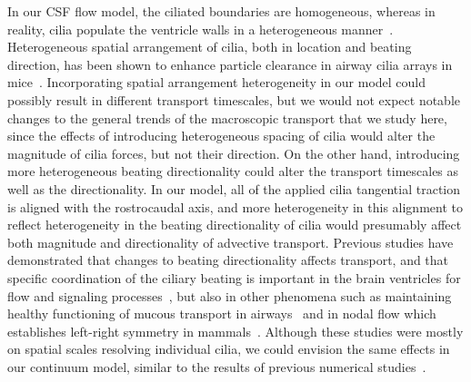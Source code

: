 \documentclass[fleqn]{wlscirep}
\begin{document}
In our CSF flow model, the ciliated boundaries are homogeneous, whereas in reality, cilia populate the ventricle walls in a heterogeneous manner~\cite{Olstad2019CiliaryDevelopment}. Heterogeneous spatial arrangement of cilia, both in location and beating direction, has been shown to enhance particle clearance in airway cilia arrays in mice~\cite{Ramirez-SanJuan2020Multi-scaleArrays}. Incorporating spatial arrangement heterogeneity in our model could possibly result in different transport timescales, but we would not expect notable changes to the general trends of the macroscopic transport that we study here, since the effects of introducing heterogeneous spacing of cilia would alter the magnitude of cilia forces, but not their direction. On the other hand, introducing more heterogeneous beating directionality could alter the transport timescales as well as the directionality. In our model, all of the applied cilia tangential traction is aligned with the rostrocaudal axis, and more heterogeneity in this alignment to reflect heterogeneity in the beating directionality of cilia would presumably affect both magnitude and directionality of advective transport. Previous studies have demonstrated that changes to beating directionality affects transport, and that specific coordination of the ciliary beating is important in the brain ventricles for flow and signaling processes~\cite{Eichele2020Cilia-drivenVentricle, Olstad2019CiliaryDevelopment, Faubel2016Cilia-basedVentricles, Guirao2010CouplingCilia, Afzelius2004Cilia-relatedDiseases}, but also in other phenomena such as maintaining healthy functioning of mucous transport in airways~\cite{Rayner1996CiliarySyndrome, Schneiter2021Multi-scaleFunction, Bustamante-Marin2019LackClearance, Tsukita2012CoordinatedFeet} and in nodal flow which establishes left-right symmetry in mammals~\cite{Yoshiba2014RolesSymmetry, Hirokawa2006NodalAsymmetry, Sawamoto2006NewBrain}. Although these studies were mostly on spatial scales resolving individual cilia, we could envision the same effects in our continuum model, similar to the results of previous numerical studies~\cite{Ramirez-SanJuan2020Multi-scaleArrays, Thouvenin2020OriginCanal, Yoshida2022EffectVentricles}. 
\end{document}
